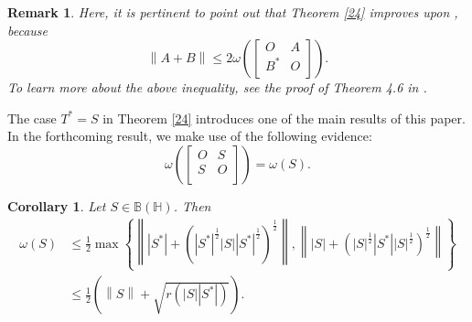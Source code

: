\documentclass[12pt,twoside,reqno]{amsart}
\newtheorem{remark}{Remark}[section]
\newtheorem{corollary}{Corollary}[section]
\numberwithin{equation}{section}
\begin{document}
\begin{remark}
Here, it is pertinent to point out that Theorem \ref{24} improves upon \cite[Theorem 2.1]{SMK}, because 
\[\left\| A+B \right\|\le 2\omega \left( \left[ \begin{matrix}
   O & A  \\
   {{B}^{*}} & O  \\
\end{matrix} \right] \right).\]
To learn more about the above inequality, see the proof of Theorem 4.6 in \cite{HKS}.
\end{remark}




The case ${{T}^{*}}=S$ in Theorem \ref{24} introduces one of the main results of this paper. In the forthcoming result, we make use of the following evidence:
\[\omega \left( \left[ \begin{matrix}
   O & S  \\
   S & O  \\
\end{matrix} \right] \right)=\omega \left( S \right).\]
\begin{corollary}\label{10}
Let $S\in \mathbb B\left( \mathbb H \right)$. Then 
\[\begin{aligned}
   \omega \left( S \right)&\le \frac{1}{2}\max \left\{ \left\| \left| {{S}^{*}} \right|+{{\left( {{\left| {{S}^{*}} \right|}^{\frac{1}{2}}}\left| S \right|\left| {{S}^{*}} \right| ^{\frac{1}{2}}\right)}^{\frac{1}{2}}} \right\|,\left\| \left| S \right|+{{\left( {{\left| S \right|}^{\frac{1}{2}}}\left| {{S}^{*}} \right|\left| S \right| ^{\frac{1}{2}}\right)}^{\frac{1}{2}}} \right\| \right\} \\ 
 & \le \frac{1}{2}\left( \left\| S \right\|+\sqrt{r\left( \left| S \right|\left| {{S}^{*}} \right| \right)} \right).  
\end{aligned}\]
\end{corollary}
\end{document}
